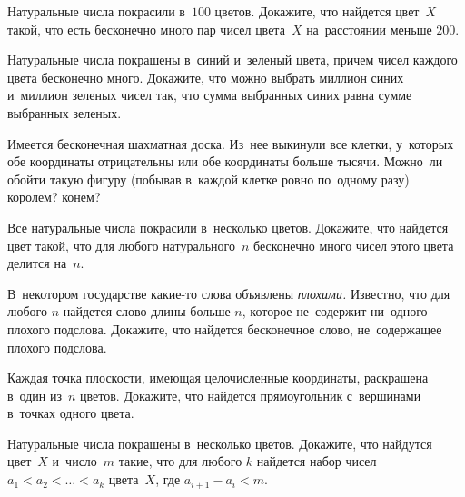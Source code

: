 


\begin{problems}

\item
Натуральные числа покрасили в~$100$ цветов.
Докажите, что найдется цвет~$X$ такой, что есть бесконечно много пар чисел
цвета~$X$ на~расстоянии меньше $200$.

\item
Натуральные числа покрашены в~синий и~зеленый цвета, причем чисел каждого цвета
бесконечно много.
Докажите, что можно выбрать миллион синих и~миллион зеленых чисел так, что
сумма выбранных синих равна сумме выбранных зеленых.

\item
Имеется бесконечная шахматная доска.
Из~нее выкинули все клетки, у~которых обе координаты отрицательны или обе
координаты больше тысячи.
Можно~ли обойти такую фигуру (побывав в~каждой клетке ровно по~одному разу)
\\
\subproblem королем?
\qquad
\subproblem конем?

\item
Все натуральные числа покрасили в~несколько цветов.
Докажите, что найдется цвет такой, что для любого натурального~$n$ бесконечно
много чисел этого цвета делится на~$n$.

\item
В~некотором государстве какие-то слова объявлены \emph{плохими.}
Известно, что для любого $n$ найдется слово длины больше $n$, которое
не~содержит ни~одного плохого подслова.
Докажите, что найдется бесконечное слово, не~содержащее плохого подслова.

\item
Каждая точка плоскости, имеющая целочисленные координаты, раскрашена в~один
из~$n$ цветов.
Докажите, что найдется прямоугольник с~вершинами в~точках одного цвета.

\item
Натуральные числа покрашены в~несколько цветов.
Докажите, что найдутся цвет~$X$ и~число~$m$ такие, что для любого $k$ найдется
набор чисел $a_{1} < a_{2} < \ldots < a_{k}$ цвета~$X$, где
$a_{i+1} - a_{i} < m$.

\end{problems}

